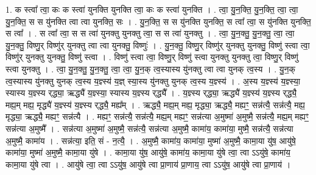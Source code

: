 \documentclass[17pt]{extarticle}
\begin{document}
1. क स्त्वा᳚ त्वा॒ कः क स्त्वा॑ युनक्ति युनक्ति त्वा॒ कः क स्त्वा॑ युनक्ति । . त्वा॒ यु॒न॒क्ति॒ यु॒न॒क्ति॒ त्वा॒ त्वा॒ यु॒न॒क्ति॒ स स यु॑नक्ति त्वा त्वा युनक्ति॒ सः । . यु॒न॒क्ति॒ स स यु॑नक्ति युनक्ति॒ स त्वा᳚ त्वा॒ स यु॑नक्ति युनक्ति॒ स त्वा᳚ । . स त्वा᳚ त्वा॒ स स त्वा॑ युनक्तु युनक्तु त्वा॒ स स त्वा॑ युनक्तु । . त्वा॒ यु॒न॒क्तु॒ यु॒न॒क्तु॒ त्वा॒ त्वा॒ यु॒न॒क्तु॒ विष्णु॒र् विष्णु॑र् युनक्तु त्वा त्वा युनक्तु॒ विष्णुः॑ । . यु॒न॒क्तु॒ विष्णु॒र् विष्णु॑र् युनक्तु युनक्तु॒ विष्णु॑ स्त्वा त्वा॒ विष्णु॑र् युनक्तु युनक्तु॒ विष्णु॑ स्त्वा । . विष्णु॑ स्त्वा त्वा॒ विष्णु॒र् विष्णु॑ स्त्वा युनक्तु युनक्तु त्वा॒ विष्णु॒र् विष्णु॑ स्त्वा युनक्तु । . त्वा॒ यु॒न॒क्तु॒ यु॒न॒क्तु॒ त्वा॒ त्वा॒ यु॒न॒क् त्व॒स्यास्य यु॑नक्तु त्वा त्वा युनक् त्व॒स्य । . यु॒न॒क् त्व॒स्यास्य यु॑नक्तु युनक् त्व॒स्य य॒ज्ञ्स्य॑ य॒ज्ञ् स्या॒स्य यु॑नक्तु युनक् त्व॒स्य य॒ज्ञ्स्य॑ । . अ॒स्य य॒ज्ञ्स्य॑ य॒ज्ञ्स्या॒ स्यास्य य॒ज्ञ्स्य र्‌द्ध्या॒ ऋद्ध्यै॑ य॒ज्ञ्स्या॒ स्यास्य य॒ज्ञ्स्य र्‌द्ध्यै᳚ । . य॒ज्ञ्स्य र्‌द्ध्या॒ ऋद्ध्यै॑ य॒ज्ञ्स्य॑ य॒ज्ञ्स्य र्‌द्ध्यै॒ मह्य॒म् मह्य॒ मृद्ध्यै॑ य॒ज्ञ्स्य॑ य॒ज्ञ्स्य र्‌द्ध्यै॒ मह्य᳚म् । . ऋद्ध्यै॒ मह्य॒म् मह्य॒ मृद्ध्या॒ ऋद्ध्यै॒ मह्यꣳ॒॒ सन्न॑त्यै॒ सन्न॑त्यै॒ मह्य॒ मृद्ध्या॒ ऋद्ध्यै॒ मह्यꣳ॒॒ सन्न॑त्यै । . मह्यꣳ॒॒ सन्न॑त्यै॒ सन्न॑त्यै॒ मह्य॒म् मह्यꣳ॒॒ सन्न॑त्या अ॒मुष्मा॑ अ॒मुष्मै॒ सन्न॑त्यै॒ मह्य॒म् मह्यꣳ॒॒ सन्न॑त्या अ॒मुष्मै᳚ । . सन्न॑त्या अ॒मुष्मा॑ अ॒मुष्मै॒ सन्न॑त्यै॒ सन्न॑त्या अ॒मुष्मै॒ कामा॑य॒ कामा॑या॒ मुष्मै॒ सन्न॑त्यै॒ सन्न॑त्या अ॒मुष्मै॒ कामा॑य । . सन्न॑त्या॒ इति॒ सं - न॒त्यै॒ । . अ॒मुष्मै॒ कामा॑य॒ कामा॑या॒ मुष्मा॑ अ॒मुष्मै॒ कामा॒या यु॑ष॒ आयु॑षे॒ कामा॑या॒ मुष्मा॑ अ॒मुष्मै॒ कामा॒या यु॑षे । . कामा॒या यु॑ष॒ आयु॑षे॒ कामा॑य॒ कामा॒या यु॑षे त्वा॒ त्वा ऽऽयु॑षे॒ कामा॑य॒ कामा॒या यु॑षे त्वा । . आयु॑षे त्वा॒ त्वा ऽऽयु॑ष॒ आयु॑षे त्वा प्रा॒णाय॑ प्रा॒णाय॒ त्वा ऽऽयु॑ष॒ आयु॑षे त्वा प्रा॒णाय॑ । \newline
\end{document}
